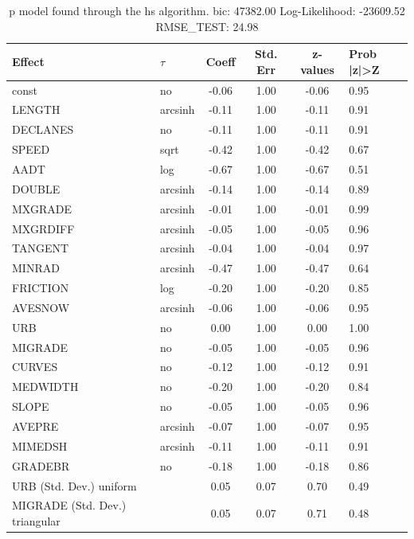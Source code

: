 \begin{table}
	\caption{p model found through the hs algorithm. bic: 47382.00 Log-Likelihood: -23609.52 RMSE_TEST: 24.98}
	\begin{center}
		\begin{tabular}{|l|l|c|c|c|l|}
			\hline
			Effect & $\tau$ & Coeff & Std. Err & z-values & Prob |z|>Z \\
			\hline
			const & no & -0.06 & 1.00 & -0.06 & 0.95 \\
			\hline
			LENGTH & arcsinh & -0.11 & 1.00 & -0.11 & 0.91 \\
			\hline
			DECLANES & no & -0.11 & 1.00 & -0.11 & 0.91 \\
			\hline
			SPEED & sqrt & -0.42 & 1.00 & -0.42 & 0.67 \\
			\hline
			AADT & log & -0.67 & 1.00 & -0.67 & 0.51 \\
			\hline
			DOUBLE & arcsinh & -0.14 & 1.00 & -0.14 & 0.89 \\
			\hline
			MXGRADE & arcsinh & -0.01 & 1.00 & -0.01 & 0.99 \\
			\hline
			MXGRDIFF & arcsinh & -0.05 & 1.00 & -0.05 & 0.96 \\
			\hline
			TANGENT & arcsinh & -0.04 & 1.00 & -0.04 & 0.97 \\
			\hline
			MINRAD & arcsinh & -0.47 & 1.00 & -0.47 & 0.64 \\
			\hline
			FRICTION & log & -0.20 & 1.00 & -0.20 & 0.85 \\
			\hline
			AVESNOW & arcsinh & -0.06 & 1.00 & -0.06 & 0.95 \\
			\hline
			URB & no & 0.00 & 1.00 & 0.00 & 1.00 \\
			\hline
			MIGRADE & no & -0.05 & 1.00 & -0.05 & 0.96 \\
			\hline
			CURVES & no & -0.12 & 1.00 & -0.12 & 0.91 \\
			\hline
			MEDWIDTH & no & -0.20 & 1.00 & -0.20 & 0.84 \\
			\hline
			SLOPE & no & -0.05 & 1.00 & -0.05 & 0.96 \\
			\hline
			AVEPRE & arcsinh & -0.07 & 1.00 & -0.07 & 0.95 \\
			\hline
			MIMEDSH & arcsinh & -0.11 & 1.00 & -0.11 & 0.91 \\
			\hline
			GRADEBR & no & -0.18 & 1.00 & -0.18 & 0.86 \\
			\hline
			URB (Std. Dev.) uniform &  & 0.05 & 0.07 & 0.70 & 0.49 \\
			\hline
			MIGRADE (Std. Dev.) triangular &  & 0.05 & 0.07 & 0.71 & 0.48 \\

\end{tabular}
\end{center}
\end{table}
